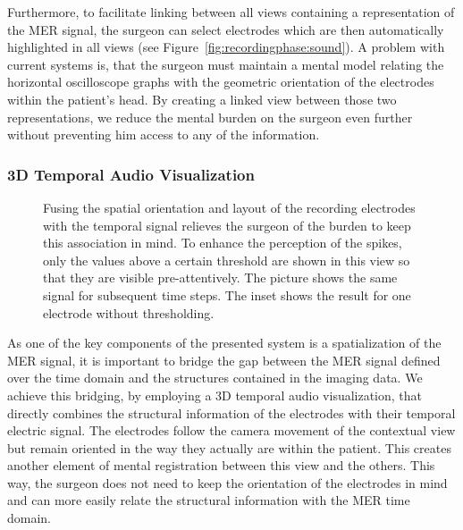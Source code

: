 \documentclass[journal]{vgtc}                %
\begin{document}
Furthermore, to facilitate linking between all views containing a representation of the MER signal, the surgeon can select electrodes which are then automatically highlighted in all views (see Figure~\ref{fig:recordingphase:sound}). A problem with current systems is, that the surgeon must maintain a mental model relating the horizontal oscilloscope graphs with the geometric orientation of the electrodes within the patient's head. By creating a linked view between those two representations, we reduce the mental burden on the surgeon even further without preventing him access to any of the information.


\subsubsection{3D Temporal Audio Visualization}\label{sec:overview:recording:3daudio}
\begin{figure}[t]
    \centering
    \caption{Fusing the spatial orientation and layout of the recording electrodes with the temporal signal relieves the surgeon of the burden to keep this association in mind. To enhance the perception of the spikes, only the values above a certain threshold are shown in this view so that they are visible pre-attentively. The picture shows the same signal for subsequent time steps. The inset shows the result for one electrode without thresholding.}
    \label{fig:recordingphase:3dsound}
\end{figure}

As one of the key components of the presented system is a spatialization of the MER signal, it is important to bridge the gap between the MER signal defined over the time domain and the structures contained in the imaging data. We achieve this bridging, by employing a 3D temporal audio visualization, that directly combines the structural information of the electrodes with their temporal electric signal. The electrodes follow the camera movement of the contextual view but remain oriented in the way they actually are within the patient. This creates another element of mental registration between this view and the others. This way, the surgeon does not need to keep the orientation of the electrodes in mind and can more easily relate the structural information with the MER time domain. 
\end{document}
